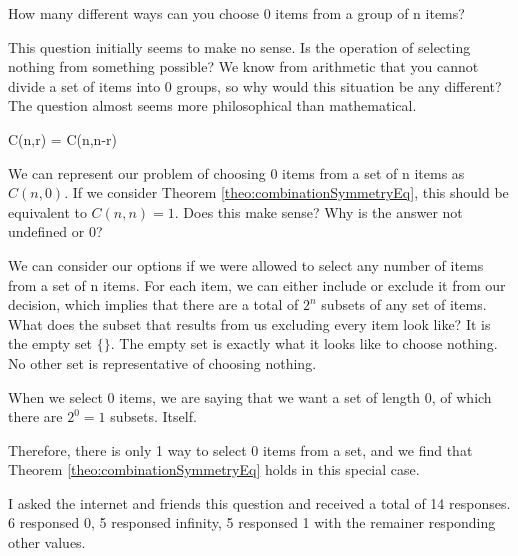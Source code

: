 How many different ways can you choose 0 items from a group of n items?

This question initially seems to make no sense. Is the operation of selecting nothing from something possible? We know from arithmetic that you cannot divide a set of items into 0 groups, so why would this situation be any different? The question almost seems more philosophical than mathematical.

\begin{theo}
C(n,r) = C(n,n-r)
\label{theo:combinationSymmetryEq}
\end{theo}

We can represent our problem of choosing 0 items from a set of n items as $C(n,0)$. If we consider Theorem \ref{theo:combinationSymmetryEq}, this should be equivalent to $C(n,n)=1$. Does this make sense? Why is the answer not undefined or 0?

We can consider our options if we were allowed to select any number of items from a set of n items. For each item, we can either include or exclude it from our decision, which implies that there are a total of $2^n$ subsets of any set of items. What does the subset that results from us excluding every item look like? It is the empty set $\{\}$. The empty set is exactly what it looks like to choose nothing. No other set is representative of choosing nothing.

When we select 0 items, we are saying that we want a set of length 0, of which there are $2^0=1$ subsets. Itself.

Therefore, there is only 1 way to select 0 items from a set, and we find that Theorem \ref{theo:combinationSymmetryEq} holds in this special case.

I asked the internet and friends this question and received a total of 14 responses. 6 responsed 0, 5 responsed infinity, 5 responsed 1 with the remainer responding other values.